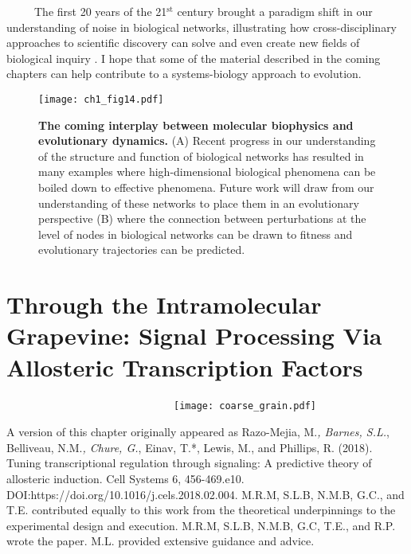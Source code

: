 \documentclass[12pt]{caltech_thesis}
\begin{document}
~~~~~The first 20 years of the 21\(^\text{st}\) century brought a
paradigm shift in our understanding of noise in biological networks,
illustrating how cross-disciplinary approaches to scientific discovery
can solve and even create new fields of biological inquiry
\autocite{ciechonska2016,eldar2010b}. I hope that some of the material
described in the coming chapters can help contribute to a
systems-biology approach to evolution.

\hypertarget{fig:molbiophys_evoldynam}{%
\begin{figure}
\centering
\texttt{[image: ch1\_fig14.pdf]}
\caption[{The coming interplay between molecular biophysics and
evolutionary dynamics.}]{\textbf{The coming interplay between molecular
biophysics and evolutionary dynamics.} (A) Recent progress in our
understanding of the structure and function of biological networks has
resulted in many examples where high-dimensional biological phenomena
can be boiled down to effective phenomena. Future work will draw from
our understanding of these networks to place them in an evolutionary
perspective (B) where the connection between perturbations at the level
of nodes in biological networks can be drawn to fitness and evolutionary
trajectories can be predicted.}
\label{fig:molbiophys_evoldynam}
\end{figure}
}

\hypertarget{through-the-intramolecular-grapevine-signal-processing-via-allosteric-transcription-factors}{%
\chapter{Through the Intramolecular Grapevine: Signal Processing Via
Allosteric Transcription
Factors}\label{through-the-intramolecular-grapevine-signal-processing-via-allosteric-transcription-factors}}

~~~~~~~~~~~~~~~~~~~~~~~~~~~~~~\texttt{[image: coarse\_grain.pdf]}

A version of this chapter originally appeared as Razo-Mejia, M.\emph{,
Barnes, S.L.}, Belliveau, N.M.\emph{, Chure, G.}, Einav, T.*, Lewis, M.,
and Phillips, R. (2018). Tuning transcriptional regulation through
signaling: A predictive theory of allosteric induction. Cell Systems 6,
456-469.e10. DOI:https://doi.org/10.1016/j.cels.2018.02.004. M.R.M,
S.L.B, N.M.B, G.C., and T.E. contributed equally to this work from the
theoretical underpinnings to the experimental design and execution.
M.R.M, S.L.B, N.M.B, G.C, T.E., and R.P. wrote the paper. M.L. provided
extensive guidance and advice.
\end{document}
